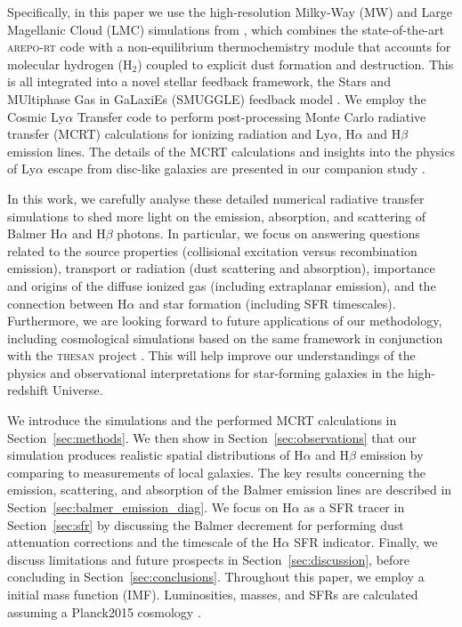 \documentclass[fleqn,usenatbib]{mnras}
\begin{document}
Specifically, in this paper we use the high-resolution Milky-Way (MW) and Large Magellanic Cloud (LMC) simulations from \citet{kannan20_mw}, which combines the state-of-the-art \textsc{arepo-rt} code \citep{kannan19_rt} with a non-equilibrium thermochemistry module that accounts for molecular hydrogen (H$_2$) coupled to explicit dust formation and destruction. This is all integrated into a novel stellar feedback framework, the Stars and MUltiphase Gas in GaLaxiEs (SMUGGLE) feedback model \citep{marinacci19}. We employ the Cosmic Ly$\alpha$ Transfer code \citep[\textsc{colt};][]{smith15, smith19} to perform post-processing Monte Carlo radiative transfer (MCRT) calculations for ionizing radiation and Ly$\alpha$, H$\alpha$ and H$\beta$ emission lines. The details of the MCRT calculations and insights into the physics of Ly$\alpha$ escape from disc-like galaxies are presented in our companion study \citep{smith21_rt}.

In this work, we carefully analyse these detailed numerical radiative transfer simulations to shed more light on the emission, absorption, and scattering of Balmer H$\alpha$ and H$\beta$ photons. In particular, we focus on answering questions related to the source properties (collisional excitation versus recombination emission), transport or radiation (dust scattering and absorption), importance and origins of the diffuse ionized gas (including extraplanar emission), and the connection between H$\alpha$ and star formation (including SFR timescales). Furthermore, we are looking forward to future applications of our methodology, including cosmological simulations based on the same framework in conjunction with the \textsc{thesan} project \citep{kannan21, garaldi21, smith21}. This will help improve our understandings of the physics and observational interpretations for star-forming galaxies in the high-redshift Universe.

We introduce the simulations and the performed MCRT calculations in Section~\ref{sec:methods}. We then show in Section~\ref{sec:observations} that our simulation produces realistic spatial distributions of H$\alpha$ and H$\beta$ emission by comparing to measurements of local galaxies. The key results concerning the emission, scattering, and absorption of the Balmer emission lines are described in Section~\ref{sec:balmer_emission_diag}. We focus on H$\alpha$ as a SFR tracer in Section~\ref{sec:sfr} by discussing the Balmer decrement for performing dust attenuation corrections and the timescale of the H$\alpha$ SFR indicator. Finally, we discuss limitations and future prospects in Section~\ref{sec:discussion}, before concluding in Section~\ref{sec:conclusions}.
Throughout this paper, we employ a \citet{chabrier03} initial mass function (IMF). Luminosities, masses, and SFRs are calculated assuming a Planck2015 cosmology \citep{planck-collaboration16}.
\end{document}
